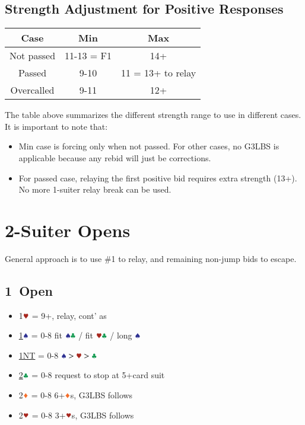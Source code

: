 \documentclass{article}
\begin{document}
\begin{multicols}{2}
\begin{CJK*}{UTF8}{gt}
\subsection{Strength Adjustment for Positive Responses}
\begin{tabular}{c|c|c}
    \hline
    Case & Min & Max \\ \hline
    Not passed & 11-13 = F1 & 14+ \\ \hline
    Passed & 9-10 & 11 = 13+ to relay \\ \hline
    Overcalled & 9-11 & 12+ \\ \hline
\end{tabular}

\noindent The table above summarizes the different strength range to use in different cases. It is important to note that:
\begin{itemize}
    \item Min case is forcing only when not passed. For other cases, no G3LBS is applicable because any rebid will just be corrections.
    \item For passed case, relaying the first positive bid requires extra strength (13+). No more 1-suiter relay break can be used.
\end{itemize}

\section{2-Suiter Opens}
General approach is to use \#1 to relay, and remaining non-jump bids to escape.

\subsection{1\DDD\ Open}\label{sec:1d}
\begin{itemize}
    \item 1$\hhh$ = 9+, relay, cont' as 
    \item \hyperref[sec:1d-escape]{1$\sss$} = 0-8 fit $\sss\ccc$ / fit $\hhh\ccc$ / long $\sss$
    \item \hyperref[sec:1d-escape]{1NT} = 0-8 $\sss>\hhh>\ccc$
    \item \hyperref[sec:1d-escape]{2$\ccc$} = 0-8 request to stop at 5+card suit
    \item 2$\ddd$ = 0-8 6+$\ddd$s, G3LBS follows
    \item 2$\hhh$ = 0-8 3+$\hhh$s, G3LBS follows
\end{itemize}


\end{CJK*}
\end{multicols}
\end{document}
